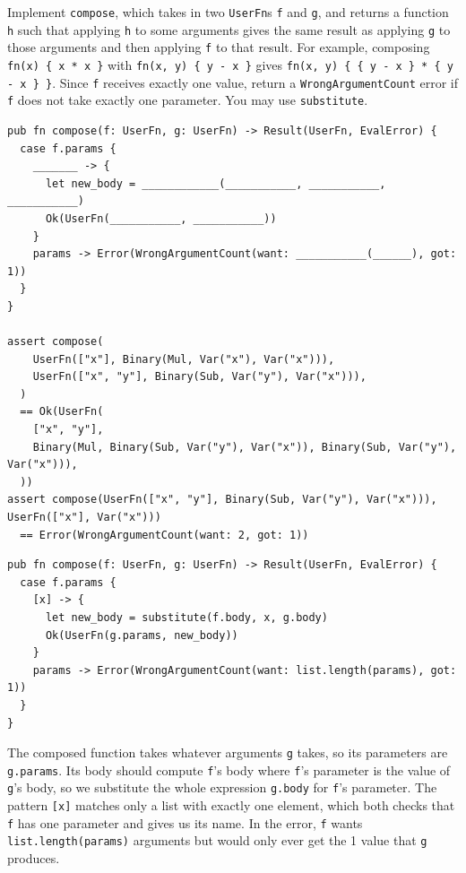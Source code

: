 \begin{blocksection}
\question Implement \texttt{compose}, which takes in two \lstinline{UserFn}s \texttt{f} and \texttt{g}, and returns a function \texttt{h} such that applying \texttt{h} to some arguments gives the same result as applying \texttt{g} to those arguments and then applying \texttt{f} to that result. For example, composing \lstinline|fn(x) { x * x }| with \lstinline|fn(x, y) { y - x }| gives \lstinline|fn(x, y) { { y - x } * { y - x } }|. Since \texttt{f} receives exactly one value, return a \lstinline{WrongArgumentCount} error if \texttt{f} does not take exactly one parameter. You may use \texttt{substitute}.
\begin{lstlisting}
pub fn compose(f: UserFn, g: UserFn) -> Result(UserFn, EvalError) {
  case f.params {
    _______ -> {
      let new_body = ____________(___________, ___________, ___________)
      Ok(UserFn(___________, ___________))
    }
    params -> Error(WrongArgumentCount(want: ___________(______), got: 1))
  }
}

assert compose(
    UserFn(["x"], Binary(Mul, Var("x"), Var("x"))),
    UserFn(["x", "y"], Binary(Sub, Var("y"), Var("x"))),
  )
  == Ok(UserFn(
    ["x", "y"],
    Binary(Mul, Binary(Sub, Var("y"), Var("x")), Binary(Sub, Var("y"), Var("x"))),
  ))
assert compose(UserFn(["x", "y"], Binary(Sub, Var("y"), Var("x"))), UserFn(["x"], Var("x")))
  == Error(WrongArgumentCount(want: 2, got: 1))
\end{lstlisting}

\begin{solution}
\begin{lstlisting}
pub fn compose(f: UserFn, g: UserFn) -> Result(UserFn, EvalError) {
  case f.params {
    [x] -> {
      let new_body = substitute(f.body, x, g.body)
      Ok(UserFn(g.params, new_body))
    }
    params -> Error(WrongArgumentCount(want: list.length(params), got: 1))
  }
}
\end{lstlisting}
\end{solution}

\begin{questionmeta}
  The composed function takes whatever arguments \texttt{g} takes, so its parameters are \lstinline{g.params}. Its body should compute \texttt{f}'s body where \texttt{f}'s parameter is the value of \texttt{g}'s body, so we substitute the whole expression \lstinline{g.body} for \texttt{f}'s parameter. The pattern \lstinline{[x]} matches only a list with exactly one element, which both checks that \texttt{f} has one parameter and gives us its name. In the error, \texttt{f} wants \lstinline{list.length(params)} arguments but would only ever get the 1 value that \texttt{g} produces.


\end{questionmeta}
\end{blocksection}
